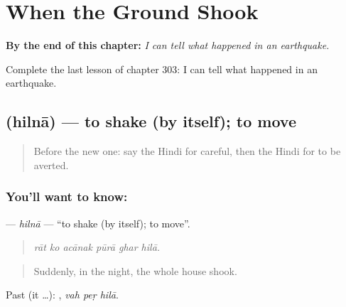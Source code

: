 
\chapter{When the Ground Shook}
\label{ch:hi-when-the-ground-shook}

\begin{chapteropening}
\textbf{By the end of this chapter:} \emph{I can tell what happened in an earthquake.}

Complete the last lesson of chapter 303: I can tell what happened in an earthquake.
\end{chapteropening}

\section[\texorpdfstring{\hi{हिलना} (hilnā)}{हिलना (hilnā)}]{ (hilnā) — to shake (by itself); to move}

\label{lesson:HI-C303-hilna}



\begin{quote}
Before the new one: say the Hindi for careful, then the Hindi for to be averted.
\end{quote}

\subsection*{You'll want to know: }
\textbf{} — \emph{hilnā} — \textquotedblleft{}to shake (by itself); to move\textquotedblright{}.

\begin{quote}
     
\end{quote}

\begin{quote}
\emph{rāt ko acānak pūrā ghar hilā.}
\end{quote}

\begin{quote}
Suddenly, in the night, the whole house shook.
\end{quote}

Past (it …):   , \emph{vah peṛ hilā}.

